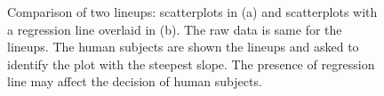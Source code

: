 \documentclass[12]{article}
\begin{document}
\begin{figure}[hbtp]
\centering
{}
	\vspace{-.1in}
\caption[Optional caption for list of figures]{Comparison of two lineups: scatterplots in (a) and scatterplots with a regression line overlaid in (b). The raw data is same for the lineups. The human subjects are shown the lineups and asked to identify the plot with the steepest slope. The presence of regression line may affect the decision of human subjects.  }
\label{plottype}
\end{figure}
\end{document}

